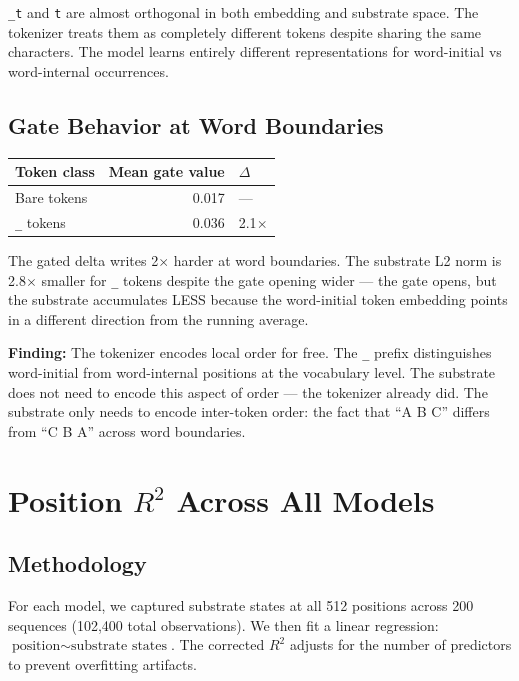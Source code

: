 \documentclass[11pt,a4paper]{report}
\newcommand{\finding}[1]{\textcolor{finding}{\textbf{Finding:}} #1}
\begin{document}
\texttt{\_t} and \texttt{t} are almost orthogonal in both embedding and substrate space. The tokenizer treats them as completely different tokens despite sharing the same characters. The model learns entirely different representations for word-initial vs word-internal occurrences.

\section{Gate Behavior at Word Boundaries}

\begin{center}
\begin{tabular}{lrl}
\toprule
Token class & Mean gate value & $\Delta$ \\
\midrule
Bare tokens & 0.017 & --- \\
\texttt{\_} tokens & 0.036 & 2.1$\times$ \\
\bottomrule
\end{tabular}
\end{center}

The gated delta writes 2$\times$ harder at word boundaries. The substrate L2 norm is 2.8$\times$ smaller for \texttt{\_} tokens despite the gate opening wider --- the gate opens, but the substrate accumulates LESS because the word-initial token embedding points in a different direction from the running average.

\finding{The tokenizer encodes local order for free.} The \texttt{\_} prefix distinguishes word-initial from word-internal positions at the vocabulary level. The substrate does not need to encode this aspect of order --- the tokenizer already did. The substrate only needs to encode inter-token order: the fact that ``A B C'' differs from ``C B A'' across word boundaries.


\chapter{Position $R^2$ Across All Models}

\section{Methodology}

For each model, we captured substrate states at all 512 positions across 200 sequences (102,400 total observations). We then fit a linear regression: $\text{position} \sim \text{substrate states}$. The corrected $R^2$ adjusts for the number of predictors to prevent overfitting artifacts.
\end{document}

